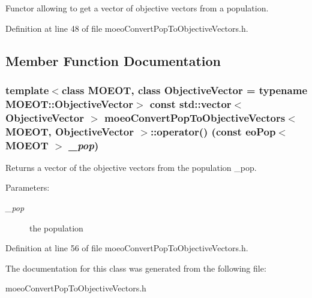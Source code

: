 Functor allowing to get a vector of objective vectors from a population. 



Definition at line 48 of file moeo\-Convert\-Pop\-To\-Objective\-Vectors.h.

\subsection{Member Function Documentation}
\subsubsection{\setlength{\rightskip}{0pt plus 5cm}template$<$class MOEOT, class Objective\-Vector = typename MOEOT::Objective\-Vector$>$ const std::vector$<$ Objective\-Vector $>$ \bf{moeo\-Convert\-Pop\-To\-Objective\-Vectors}$<$ MOEOT, Objective\-Vector $>$::operator() (const \bf{eo\-Pop}$<$ MOEOT $>$ {\em \_\-pop})\hspace{0.3cm}{\tt  [inline]}}\label{classmoeoConvertPopToObjectiveVectors_8fada75aa151a6eaa310c5064f783c86}


Returns a vector of the objective vectors from the population \_\-pop. 

\begin{Desc}
\item[Parameters:]
\begin{description}
\item[{\em \_\-pop}]the population \end{description}
\end{Desc}


Definition at line 56 of file moeo\-Convert\-Pop\-To\-Objective\-Vectors.h.

The documentation for this class was generated from the following file:\begin{CompactItemize}
\item 
moeo\-Convert\-Pop\-To\-Objective\-Vectors.h\end{CompactItemize}
